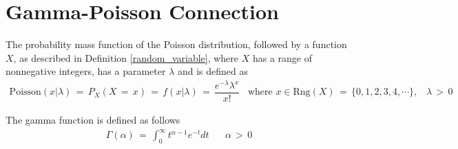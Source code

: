 \section{Gamma-Poisson Connection}

\begin{definition}
The probability mass function of the Poisson distribution, followed by a function $X$, as described in Definition \ref{random_variable}, where $X$ has a range of nonnegative integers, has a parameter $\lambda$ and is defined as
\begin{align*}
    \text{Poisson}(x | \lambda) \hspace{2pt} = \hspace{2pt} P_{X}(X \hspace{2pt} = \hspace{2pt} x) \hspace{2pt} = \hspace{2pt} f(x | \lambda) \hspace{2pt} = \hspace{2pt}  \dfrac{e^{-\lambda} \lambda^{x}}{x!} \hspace{10pt} \text{where} \hspace{4pt} x \in \text{Rng}(X) \hspace{2pt} = \hspace{2pt} \{0, 1, 2, 3, 4, \cdots\}, \hspace{10pt} \lambda \hspace{2pt} > \hspace{2pt} 0
\end{align*}
\end{definition}

\begin{definition}
The gamma function is defined as follows
\begin{align*}
    \Gamma(\alpha) \hspace{2pt} = \hspace{2pt} \int_{0}^{\infty} t^{\alpha - 1} e^{-t} dt \hspace{20pt} \alpha \hspace{2pt} > \hspace{2pt} 0 
\end{align*}
\end{definition}

